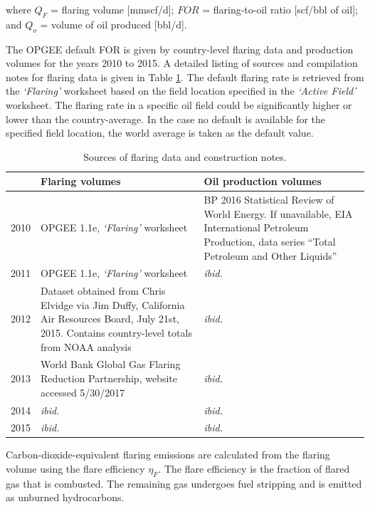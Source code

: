 \documentclass[11pt]{report}
\newcommand{\sheet}[1]{\textit{`{#1}'}}
\begin{document}
where $Q_{F}$ = flaring volume [mmscf/d]; $FOR$ = flaring-to-oil ratio [scf/bbl of oil]; and $Q_{o}$ = volume of oil produced [bbl/d].

The OPGEE default FOR is given by country-level flaring data \cite{NOAA2010} and production volumes \cite{EIA2010} for the years 2010 to 2015.  A detailed listing of sources and compilation notes for flaring data is given in Table \ref{tab:flaringdata}. The default flaring rate is retrieved from the \sheet{Flaring} worksheet based on the field location specified in the \sheet{Active Field} worksheet. The flaring rate in a specific oil field could be significantly higher or lower than the country-average. In the case no default is available for the specified field location, the world average is taken as the default value.

\begin{table}
\begin{scriptsize}
\caption{Sources of flaring data and construction notes.}
\label{tab:flaringdata}
\begin{tabular*}{1\columnwidth}{p{}p{}p{}}
\toprule
	 & Flaring volumes & Oil production volumes \\
\midrule
2010 & OPGEE 1.1e, \sheet{Flaring} worksheet & BP 2016 Statistical Review of World Energy. If unavailable, EIA International Petroleum Production, data series ``Total Petroleum and Other Liquids'' \\
2011 & OPGEE 1.1e, \sheet{Flaring} worksheet & \emph{ibid.} \\
2012 & Dataset obtained from Chris Elvidge via Jim Duffy, California Air Resources Board, July 21st, 2015. Contains country-level totals from NOAA analysis & \emph{ibid.} \\
2013 & World Bank Global Gas Flaring Reduction Partnership, website accessed 5/30/2017 & \emph{ibid.} \\
2014 & \emph{ibid.} &\emph{ibid.} \\
2015 & \emph{ibid.} &\emph{ibid.} \\
\bottomrule
\end{tabular*}
\end{scriptsize}
\end{table}

Carbon-dioxide-equivalent flaring emissions are calculated from the flaring volume using the flare efficiency $\eta_F$. The flare efficiency is the fraction of flared gas that is combusted. The remaining gas undergoes fuel stripping and is emitted as unburned hydrocarbons. 
\end{document}
